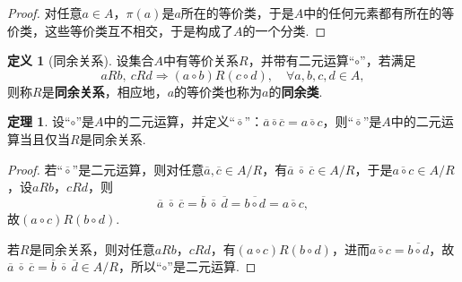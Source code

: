 \documentclass[12pt]{ctexart}
\theoremstyle{definition}
\newtheorem{definition}{定义}
\newtheorem{theorem}{定理}
\theoremstyle{plain}
\begin{document}
	\begin{proof}
		对任意$a\in A$，$\pi(a)$是$a$所在的等价类，于是$A$中的任何元素都有所在的等价类，这些等价类互不相交，于是构成了$A$的一个分类.
	\end{proof}
	\begin{definition}[同余关系]
		设集合$A$中有等价关系$R$，并带有二元运算“$\circ$”，若满足
		$$aRb,\ cRd\Rightarrow (a\circ b)R(c\circ d),\quad\forall a,b,c,d\in A,$$
		则称$R$是\textbf{同余关系}，相应地，$a$的等价类也称为$a$的\textbf{同余类}.
	\end{definition}
	\begin{theorem}
		设“$\circ$”是$A$中的二元运算，并定义“$\overline{\circ}$”：$\overline{a}\overline{\circ}\overline{c}=\overline{a\circ c}$，则“$\overline{\circ}$”是$A$中的二元运算当且仅当$R$是同余关系.
	\end{theorem}
	\begin{proof}
		若“$\overline{\circ}$”是二元运算，则对任意$\overline{a},\overline{c}\in A/R$，有$\overline{a}\ \overline{\circ}\ \overline{c}\in A/R$，于是$\overline{a\circ c}\in A/R$，设$aRb$，$cRd$，则
		$$\overline{a}\ \overline{\circ}\ \overline{c}=\overline{b}\ \overline{\circ}\ \overline{d}=\overline{b\circ d}=\overline{a\circ c},$$
		故$(a\circ c)R(b\circ d)$.
		
		若$R$是同余关系，则对任意$aRb$，$cRd$，有$(a\circ c)R(b\circ d)$，进而$\overline{a\circ c}=\overline{b\circ d}$，故$\overline{a}\ \overline{\circ}\ \overline{c}=\overline{b}\ \overline{\circ}\ \overline{d}\in A/R$，所以“$\circ$”是二元运算.
	\end{proof}
\end{document}
